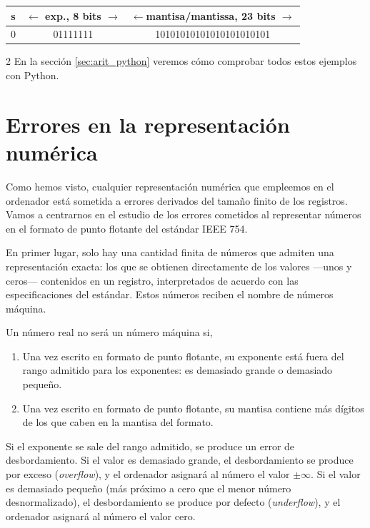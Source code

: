 \begin{center}
\begin{tabular}{|c||c||c|}
\hline
s&$\leftarrow$ exp., 8 bits $\rightarrow$&$\leftarrow$mantisa/mantissa, 23 bits $\rightarrow$\\
\hline
0&01111111&10101010101010101010101\\
\hline
\end{tabular}
\end{center}
\begin{paracol}{2}
En la sección \ref{sec:arit_python} veremos cómo comprobar todos estos ejemplos con Python.

\section{Errores en la representación numérica}\label{errn}
Como hemos visto, cualquier representación numérica que empleemos en el ordenador está sometida a errores derivados del tamaño finito de los registros. Vamos a centrarnos en el estudio de los errores cometidos al representar números en el formato de punto flotante del estándar IEEE 754.

En primer lugar, solo hay una cantidad finita de números que admiten una representación exacta: los que se obtienen directamente de los valores ---unos y ceros--- contenidos en un registro, interpretados de acuerdo con las especificaciones del estándar. Estos números reciben el nombre de números máquina.

Un número real no será un número máquina si, 

\begin{enumerate}
\item Una vez escrito en formato de punto flotante, su exponente está fuera del rango admitido para los exponentes: es demasiado grande o demasiado pequeño.

\item Una vez escrito en formato de punto flotante, su mantisa contiene más dígitos de los que caben en la mantisa del formato.
\end{enumerate}

Si el exponente se sale del rango admitido, se produce un error de desbordamiento. Si el valor es demasiado grande, el desbordamiento se produce por exceso (\emph{overflow}), y el ordenador asignará al número el valor $\pm \infty$. Si el valor es demasiado pequeño (más próximo a cero que el menor número desnormalizado), el desbordamiento se produce por defecto (\emph{underflow}), y el ordenador asignará al número el valor cero.


\end{paracol}
